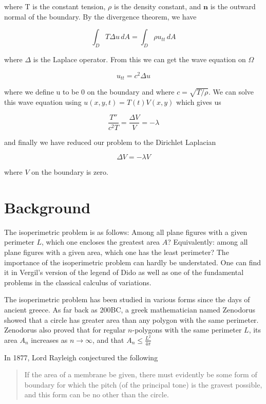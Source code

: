 \documentclass[12pt]{report}
\numberwithin{definition}{section}
\begin{document}
where T is the constant tension, $\rho$ is the density constant, and $\textbf{n}$ is the outward normal of the boundary.
By the divergence theorem, we have

$$ \int_{D} T \Delta u \, dA = \int_{D} \rho u_{tt} \, dA $$

where $\Delta$ is the Laplace operator. From this we can get the wave equation on $\Omega$

$$ u_{tt} = c^{2} \Delta u $$

where we define u to be 0 on the boundary and where $c = \sqrt{T / \rho}$.
We can solve this wave equation using $u(x,y,t) = T(t)V(x,y)$ which gives us

$$ \frac{T''}{c^{2}T} = \frac{\Delta V}{V} = - \lambda $$

and finally we have reduced our problem to the Dirichlet Laplacian

$$ \Delta V = - \lambda V $$

where $V$ on the boundary is zero.






\break


\section{Background}
The isoperimetric problem is as follows: Among all plane figures with a given perimeter $L$, which one encloses the greatest area $A$?
Equivalently: among all plane figures with a given area, which one has the least perimeter?
The importance of the isoperimetric problem can hardly be understated.
One can find it in Vergil's version of the legend of Dido as well as one of the fundamental problems in the classical calculus of variations.


The isoperimetric problem has been studied in various forms since the days of ancient greece. 
As far back as $200$BC, a greek mathematician named Zenodorus showed that a circle has greater area than any polygon with the same perimeter\cite{pappus}.
Zenodorus also proved that for regular $n $-polygons with the same perimeter $L$, its area $A_{n}$ increases as $n \to \infty$, and that $A_{n} \leq \frac{L^{2}}{4\pi}$

In 1877, Lord Rayleigh conjectured the following \cite{rayleigh}

\begin{quote}
If the area of a membrane be given, there must evidently be some
form of boundary for which the pitch (of the principal tone) is the
gravest possible, and this form can be no other than the circle.
\end{quote}
\end{document}
